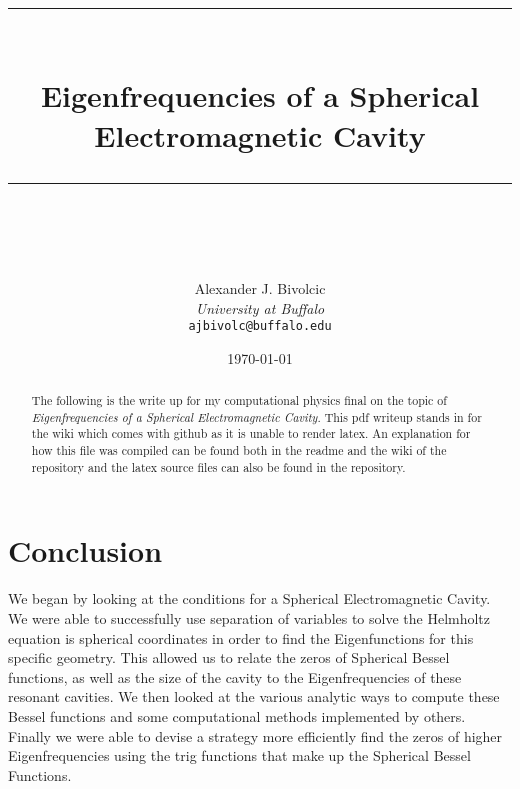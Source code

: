 \documentclass[letterpaper,12pt]{article}
\title{ \normalfont\normalsize
\textcolor{PineGreen}{\rule{\linewidth}{0.5pt}}\\
\vspace{17pt}
\textcolor{PineGreen}{{\huge Eigenfrequencies of a Spherical Electromagnetic Cavity}}\\
\vspace{9pt}
\textcolor{PineGreen}{\rule{\linewidth}{2pt}}\\
}
\author{
{\Large Alexander J. Bivolcic}\\ 
{\small \textit{University at Buffalo}}\\
{\small\texttt{ajbivolc@buffalo.edu}}
}
\date{\normalsize\today}
\begin{document}
\begin{titlepage}
\maketitle
\begin{abstract}
    The following is the write up for my computational physics final on the topic of \emph{Eigenfrequencies of a Spherical Electromagnetic Cavity}. This pdf writeup stands in for the wiki which comes with github as it is unable to render latex. An explanation for how this file was compiled can be found both in the readme and the wiki of the repository and the latex source files can also be found in the repository.
\end{abstract}
\thispagestyle{empty}
\end{titlepage}

\tableofcontents


\section{Conclusion}
We began by looking at the conditions for a Spherical Electromagnetic Cavity. We were able to successfully use separation of variables to solve the Helmholtz equation is spherical coordinates in order to find the Eigenfunctions for this specific geometry. This allowed us to relate the zeros of Spherical Bessel functions, as well as the size of the cavity to the Eigenfrequencies of these resonant cavities. We then looked at the various analytic ways to compute these Bessel functions and some computational methods implemented by others. Finally we were able to devise a strategy more efficiently find the zeros of higher Eigenfrequencies using the trig functions that make up the Spherical Bessel Functions. 

\printbibliography[title={References}]
\end{document}
